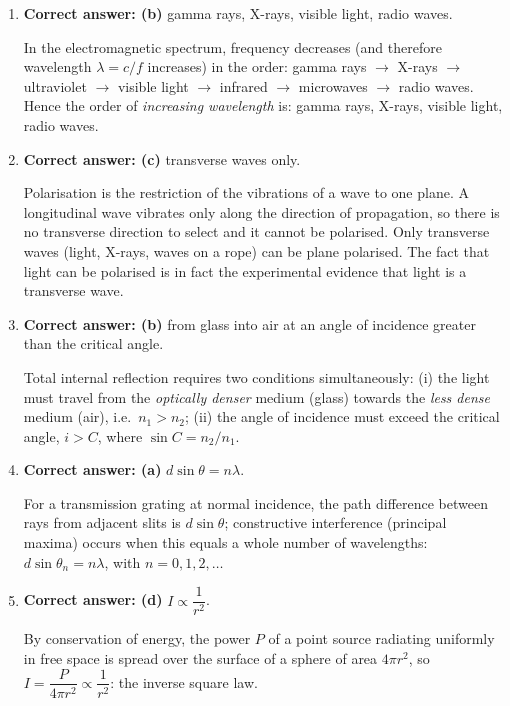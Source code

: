 \documentclass[11pt]{article}
\begin{document}
\begin{corrige}
\begin{enumerate}
\item \textbf{Correct answer: (b)} gamma rays, X-rays, visible light, radio waves.\par
In the electromagnetic spectrum, frequency decreases (and therefore wavelength $\lambda = c/f$ increases) in the order: gamma rays $\to$ X-rays $\to$ ultraviolet $\to$ visible light $\to$ infrared $\to$ microwaves $\to$ radio waves. Hence the order of \emph{increasing wavelength} is: gamma rays, X-rays, visible light, radio waves.

\item \textbf{Correct answer: (c)} transverse waves only.\par
Polarisation is the restriction of the vibrations of a wave to one plane. A longitudinal wave vibrates only along the direction of propagation, so there is no transverse direction to select and it cannot be polarised. Only transverse waves (light, X-rays, waves on a rope) can be plane polarised. The fact that light can be polarised is in fact the experimental evidence that light is a transverse wave.

\item \textbf{Correct answer: (b)} from glass into air at an angle of incidence greater than the critical angle.\par
Total internal reflection requires two conditions simultaneously: (i) the light must travel from the \emph{optically denser} medium (glass) towards the \emph{less dense} medium (air), i.e.\ $n_{1}>n_{2}$; (ii) the angle of incidence must exceed the critical angle, $i>C$, where $\sin C = n_{2}/n_{1}$.

\item \textbf{Correct answer: (a)} $d\sin\theta = n\lambda$.\par
For a transmission grating at normal incidence, the path difference between rays from adjacent slits is $d\sin\theta$; constructive interference (principal maxima) occurs when this equals a whole number of wavelengths: $d\sin\theta_{n}=n\lambda$, with $n=0,1,2,\dots$

\item \textbf{Correct answer: (d)} $I\propto \dfrac{1}{r^{2}}$.\par
By conservation of energy, the power $P$ of a point source radiating uniformly in free space is spread over the surface of a sphere of area $4\pi r^{2}$, so $I = \dfrac{P}{4\pi r^{2}} \propto \dfrac{1}{r^{2}}$: the inverse square law.
\end{enumerate}
\end{corrige}
\end{document}
